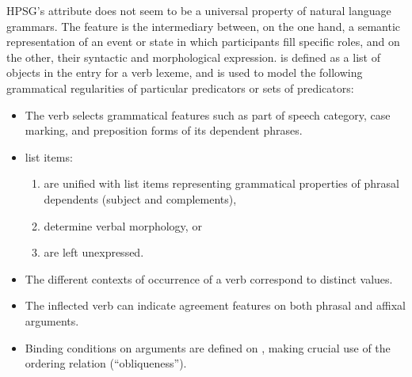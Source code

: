 \documentclass[output=paper
                ,modfonts
                ,nonflat
	        ,collection
	        ,collectionchapter
	        ,collectiontoclongg
 	        ,biblatex
                ,babelshorthands
                ,newtxmath
                ,draftmode
                ,colorlinks, citecolor=brown
]{./langsci/langscibook}
\begin{document}

HPSG's \argst attribute does not seem to be a universal property of natural
language grammars.  The \argst feature is the intermediary between, on
the one hand, a semantic representation of an event or state in which
participants fill specific roles, and on the other, their syntactic and
morphological expression.  \argst is defined as a list of 
objects in the entry for a verb lexeme, and is used to model the following grammatical regularities of particular predicators or sets of predicators:

\begin{itemize}
\item The verb selects grammatical features such as part of speech
category, case marking, and preposition forms of its dependent
phrases.
\item \argst list items:
\begin{enumerate}
\item are unified with \val list items
representing grammatical properties of phrasal dependents (subject and
complements),
\item determine verbal morphology, or
\item are left unexpressed.
\end{enumerate}
\item The different contexts of occurrence of a verb correspond to distinct \argst values.
\item The inflected verb can indicate agreement features on both phrasal
and affixal arguments.
\item Binding conditions on arguments are defined on \argst, making
crucial use of the ordering relation (``obliqueness'').
\end{itemize}
\end{document}
